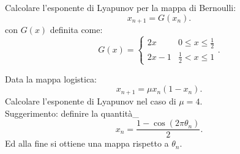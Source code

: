 \begin{ex}[]
    Calcolare l'esponente di Lyapunov per la mappa di Bernoulli:
    \[
	x_{n+1}= G(x_n) 
    .\] con $G(x)$ definita come:
    \[
	G(x) = 
	\begin{cases}
	    2x & 0\le x \le \frac{1}{2}\\
	    2x-1 & \frac{1}{2}<x\le 1
	\end{cases}
    .\] 
\end{ex}
\noindent
\begin{ex}[]
    Data la mappa logistica:
    \[
	x_{n+1}= \mu x_n (1-x_n) 
    .\] 
    Calcolare l'esponente di Lyapunov nel caso di $\mu= 4$. \\
    Suggerimento: definire la quantità_
    \[
	x_n = \frac{1-\cos (2\pi\theta_n)}{2}
    .\] Ed alla fine si ottiene una mappa rispetto a $\theta_n$.
\end{ex}
\noindent

